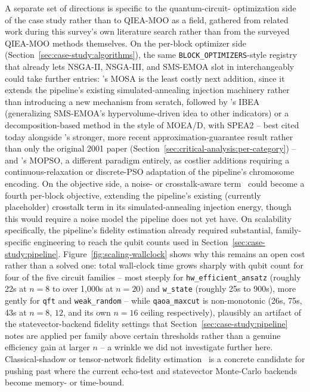 A separate set of directions is specific to the quantum-circuit-
optimization side of the case study rather than to QIEA-MOO as a
field, gathered from related work during this survey's own literature
search rather than from the surveyed QIEA-MOO methods themselves.
On the per-block optimizer side
(Section~\ref{sec:case-study:algorithms}), the same
\texttt{BLOCK\_OPTIMIZERS}-style registry that already lets NSGA-II,
NSGA-III, and SMS-EMOA slot in interchangeably could take further
entries: \citet{ulungu1999mosa}'s MOSA is the least costly next
addition, since it extends the pipeline's existing simulated-annealing
injection machinery rather than introducing a new mechanism from
scratch, followed by \citet{zitzler2004ibea}'s IBEA (generalizing
SMS-EMOA's hypervolume-driven idea to other indicators) or a
decomposition-based method in the style of MOEA/D, with SPEA2 -- best
cited today alongside \citet{alghouass2025spea2beatsnsga2}'s stronger,
more recent approximation-guarantee result rather than only the
original 2001 paper (Section~\ref{sec:critical-analysis:per-category})
-- and \citet{coello2002mopso}'s MOPSO, a different paradigm entirely,
as costlier additions requiring a continuous-relaxation or discrete-PSO
adaptation of the pipeline's chromosome encoding. On the objective
side, a noise- or crosstalk-aware term~\citep{hua2022crosstalk} could
become a fourth per-block objective, extending the pipeline's existing
(currently placeholder) crosstalk term in its simulated-annealing
injection energy, though this would require a noise model the pipeline
does not yet have. On scalability specifically, the pipeline's fidelity
estimation already required substantial, family-specific engineering to
reach the qubit counts used in Section~\ref{sec:case-study:pipeline}.
Figure~\ref{fig:scaling-wallclock} shows why this remains an open cost
rather than a solved one: total wall-clock time grows sharply with
qubit count for four of the five circuit families -- most steeply for
\texttt{hw\_efficient\_ansatz} (roughly 22s at $n{=}8$ to over 1{,}000s
at $n{=}20$) and \texttt{w\_state} (roughly 25s to 900s), more gently
for \texttt{qft} and \texttt{weak\_random} --
while \texttt{qaoa\_maxcut} is non-monotonic (26s, 75s, 43s at $n{=}8$,
$12$, and its own $n{=}16$ ceiling respectively), plausibly an artifact
of the statevector-backend fidelity settings that
Section~\ref{sec:case-study:pipeline} notes are applied per family
above certain thresholds rather than a genuine efficiency gain at
larger $n$ -- a wrinkle we did not investigate further here.
Classical-shadow or tensor-network fidelity
estimation~\citep{fu2022shadow} is a concrete candidate for pushing
past where the current echo-test and statevector Monte-Carlo backends
become memory- or time-bound.

